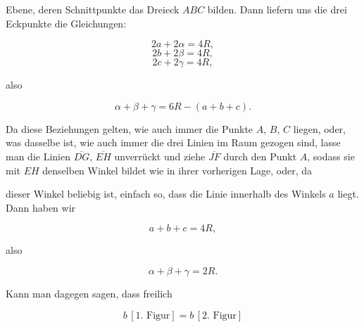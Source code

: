 %
Ebene, deren Schnittpunkte das Dreieck $ABC$ bilden. Dann liefern uns die drei Eckpunkte die Gleichungen:

\[ 2a + 2\alpha = 4R, \]
\[ 2b + 2\beta = 4R, \]
\[ 2c + 2\gamma = 4R, \]

\noindent also

\[ \alpha + \beta + \gamma = 6R - (a+b+c). \]

Da diese Beziehungen gelten, wie auch immer die Punkte $A$, $B$, $C$ liegen, oder, was dasselbe ist, wie auch immer die drei Linien im Raum gezogen sind, lasse man die Linien $\overline{DG}$, $\overline{EH}$ unverrückt und ziehe $\overline{JF}$ durch den Punkt $A$, sodass sie mit $EH$ denselben Winkel bildet wie in ihrer vorherigen Lage, oder, da

\begin{center}

\par [Fig. 2.]
\end{center}

\noindent dieser Winkel beliebig ist, einfach so, dass die Linie innerhalb des Winkels $a$ liegt. Dann haben wir

\[ a + b + c = 4R, \]

\noindent also

\[ \alpha + \beta + \gamma = 2R. \]

Kann man dagegen sagen, dass freilich

\[ b\,[\text{1. Figur}] = b\,[\text{2. Figur}] \]

